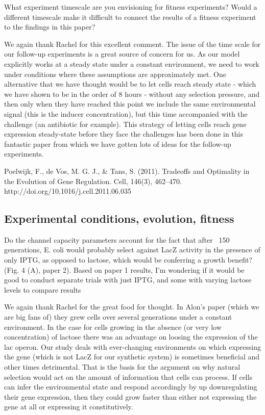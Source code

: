 \begin{tcolorbox}
What experiment timescale are you envisioning for fitness experiments? Would a
different timescale make it difficult to connect the results of a fitness
experiment to the findings in this paper?
\end{tcolorbox}
We again thank Rachel for this excellent comment. The issue of the time scale
for our follow-up experiments is a great source of concern for us. As our model
explicitly works at a steady state under a constant environment, we need to
work under conditions where these assumptions are approximately met. One
alternative that we have thought would be to let cells reach steady state -
which we have shown to be in the order of 8 hours - without any selection
pressure, and then only when they have reached this point we include the same
environmental signal (this is the inducer concentration), but this time
accompanied with the challenge (an antibiotic for example). This strategy of
letting cells reach gene expression steady-state before they face the challenges
has been done in this fantastic paper from which we have gotten lots of ideas
for the follow-up experiments.

Poelwijk, F., de Vos, M. G. J., & Tans, S. (2011). Tradeoffs and Optimality in
the Evolution of Gene Regulation. Cell, 146(3), 462–470.
http://doi.org/10.1016/j.cell.2011.06.035

\subsection{Experimental conditions, evolution, fitness}

\begin{tcolorbox}
Do the channel capacity parameters account for the fact that after ~150
generations, E. coli would probably select against LacZ activity in the presence
of only IPTG, as opposed to lactose, which would be conferring a growth benefit?
(Fig. 4 (A), paper 2). Based on paper 1 results, I’m wondering if it would be
good to conduct separate trials with just IPTG, and some with varying lactose
levels to compare results
\end{tcolorbox}
We again thank Rachel for the great food for thought. In Alon's paper (which we
are big fans of) they grew cells over several generations under a constant
environment. In the case for cells growing in the absence (or very low
concentration) of lactose there was an advantage on loosing the expression of
the lac operon. Our study deals with ever-changing environments on which
expressing the gene (which is not LacZ for our synthetic system) is sometimes
beneficial and other times detrimental. That is the basis for the argument on
why natural selection would act on the amount of information that cells can
process. If cells can infer the environmental state and respond accordingly by
up downregulating their gene expression, then they could grow faster than either
not expressing the gene at all or expressing it constitutively.

